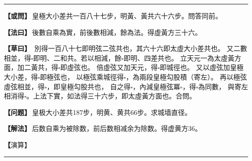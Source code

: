 \documentclass[11pt,a4paper]{article}
\let\origsquare\square
\renewcommand{\square}{\ensuremath{\origsquare}}%
\newcommand{\longline}{\noindent\rule{\textwidth}{0.4pt}}
\newcommand{\clOWEN}[1]{%
  \par\vspace{0.3em}%
  \noindent\textcolor{problemcolor}{\textbf{【或問】}}\,{\tradfont #1}\par\nopagebreak%
}
\newcommand{\mdOWEN}[1]{%
  \par\vspace{0.3em}%
  \noindent\textcolor{problemcolor}{\textbf{【问题】}}\,{\modfont #1}\par\nopagebreak%
}
\newcommand{\clFAYUE}[1]{%
  \par\noindent\textcolor{methodcolor}{\textbf{【法曰】}}\,{\tradfont #1}\par\nopagebreak%
}
\newcommand{\mdFAYUE}[1]{%
  \par\noindent\textcolor{methodcolor}{\textbf{【解法】}}\,{\modfont #1}\par\nopagebreak%
}
\newcommand{\clTSAOYUE}[1]{%
  \par\noindent\textcolor{workcolor}{\textbf{【草曰】}}\,{\tradfont #1}\par%
}
\newcommand{\mdTSAOYUE}[1]{%
  \par\noindent\textcolor{workcolor}{\textbf【演算】}}\,{\modfont #1}\par%
\begin{document}
\vspace{0.3cm}
\begin{center}\longline\end{center}

\begin{paracol}{2}

\begin{leftcolumn}
\clOWEN{皇極大小差共一百八十七步，明黃、黃共六十六步。問答同前。}

\clFAYUE{後數自乘為實，前後數相減，餘為法。得虛黃方三十六。}

\clTSAOYUE{%
別得一百八十七即明弦二弦共也，其六十六即太虛大小差共也。
又二數相並，得$\square$即明、二和共。若以相減，餘$\square$即明、四差共也。
立天元一為太虛黃方面，加二黃共，得$\square$即虛弦也。
倍虛弦又加天元，得$\square$即城徑也。
又以虛弦加皇極大小差，得$\square$即極弦也，
以極弦乘城徑得$\square$，為兩段皇極勾股積（寄左）。
再以極弦虛弦相並，得$\square$，即皇極勾股共也，
自之得$\square$，內減皇極弦冪$\square$，得$\square$為同數，
與寄左相消得$\square$。上法下實，如法得三十六步，即太虛黃方面也。合問。}
\end{leftcolumn}

\switchcolumn

\begin{rightcolumn}
\mdOWEN{皇极大小差共187步，明黄、黄共66步。求城墙直径。}

\mdFAYUE{后数自乘为被除数，前后数相减余为除数。得虚黄方36。}

\mdTSAOYUE{%
辨识得：187即明弦与二弦之和，66即太虚大小差之和。
两数相加得$\square$即明与二和之和。若相减余$\square$即明与四差之和。
设天元一为太虚黄方面，加二黄共得$\square$即虚弦。
两倍虚弦再加天元得$\square$即城径。
又以虚弦加皇极大小差得$\square$即极弦，
极弦乘城径得$\square$为两段皇极勾股积（寄左）。
再以极弦虚弦相加得$\square$即皇极勾股之和，
自乘得$\square$，减去皇极弦冪$\square$得$\square$为同数，
与寄左相消得$\square$。上法下实，依法得36步，即太虚黄方面。符合所问。}
\end{rightcolumn}

\end{paracol}

\vspace{0.3cm}
\begin{center}\longline\end{center}
\end{document}
